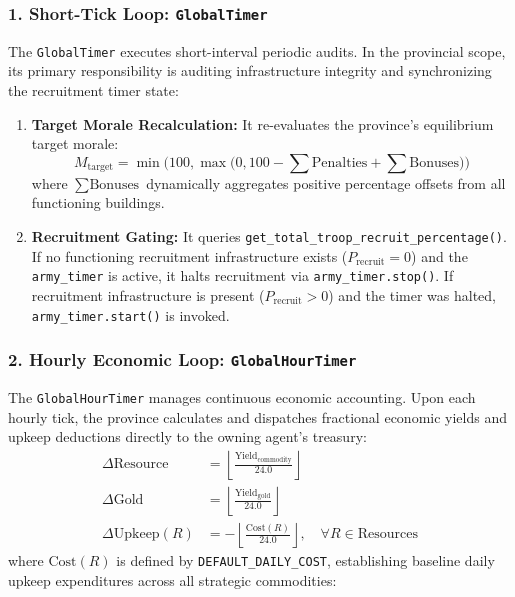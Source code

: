 \subsubsection{1. Short-Tick Loop: \texttt{GlobalTimer}}
The \texttt{GlobalTimer} executes short-interval periodic audits. In the provincial scope, its primary responsibility is auditing infrastructure integrity and synchronizing the recruitment timer state:
\begin{enumerate}
    \item \textbf{Target Morale Recalculation:} It re-evaluates the province's equilibrium target morale:
    \begin{equation}
        M_{\text{target}} = \min\Big(100, \max\big(0, 100 - \sum \text{Penalties} + \sum \text{Bonuses}\big)\Big)
    \end{equation}
    where $\sum \text{Bonuses}$ dynamically aggregates positive percentage offsets from all functioning buildings.
    \item \textbf{Recruitment Gating:} It queries \texttt{get\_total\_troop\_recruit\_percentage()}. If no functioning recruitment infrastructure exists ($P_{\text{recruit}} = 0$) and the \texttt{army\_timer} is active, it halts recruitment via \texttt{army\_timer.stop()}. If recruitment infrastructure is present ($P_{\text{recruit}} > 0$) and the timer was halted, \texttt{army\_timer.start()} is invoked.
\end{enumerate}

\subsubsection{2. Hourly Economic Loop: \texttt{GlobalHourTimer}}
The \texttt{GlobalHourTimer} manages continuous economic accounting. Upon each hourly tick, the province calculates and dispatches fractional economic yields and upkeep deductions directly to the owning agent's treasury:
\begin{align}
    \Delta \text{Resource} &= \left\lfloor \frac{\text{Yield}_{\text{commodity}}}{24.0} \right\rfloor \\
    \Delta \text{Gold} &= \left\lfloor \frac{\text{Yield}_{\text{gold}}}{24.0} \right\rfloor \\
    \Delta \text{Upkeep}(R) &= -\left\lfloor \frac{\text{Cost}(R)}{24.0} \right\rfloor, \quad \forall R \in \text{Resources}
\end{align}
where $\text{Cost}(R)$ is defined by \texttt{DEFAULT\_DAILY\_COST}, establishing baseline daily upkeep expenditures across all strategic commodities:

